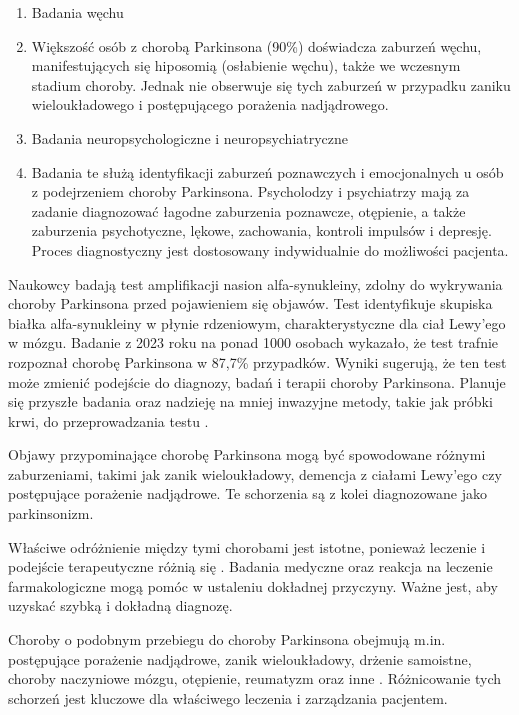 \begin{enumerate}
	\item Badania węchu
	\item[]Większość osób z chorobą Parkinsona (90\%) doświadcza zaburzeń węchu, manifestujących się hiposomią (osłabienie węchu), także we wczesnym stadium choroby.
Jednak nie obserwuje się tych zaburzeń w przypadku zaniku wieloukładowego i postępującego porażenia nadjądrowego.

	\item Badania neuropsychologiczne i neuropsychiatryczne
	\item[]Badania te służą identyfikacji zaburzeń poznawczych i emocjonalnych u osób z podejrzeniem choroby Parkinsona.
Psycholodzy i psychiatrzy mają za zadanie diagnozować łagodne zaburzenia poznawcze, otępienie, a także zaburzenia psychotyczne, lękowe, zachowania, kontroli impulsów i depresję.
Proces diagnostyczny jest dostosowany indywidualnie do możliwości pacjenta.
\end{enumerate}

Naukowcy badają test amplifikacji nasion alfa-synukleiny, zdolny do wykrywania choroby Parkinsona przed pojawieniem się objawów.
Test identyfikuje skupiska białka alfa-synukleiny w płynie rdzeniowym, charakterystyczne dla ciał Lewy'ego w mózgu.
Badanie z 2023 roku na ponad 1000 osobach wykazało, że test trafnie rozpoznał chorobę Parkinsona w 87,7\% przypadków.
Wyniki sugerują, że ten test może zmienić podejście do diagnozy, badań i terapii choroby Parkinsona.
Planuje się przyszłe badania oraz nadzieję na mniej inwazyjne metody, takie jak próbki krwi, do przeprowadzania testu \cite{Mayo_Clinic_PD}.

Objawy przypominające chorobę Parkinsona mogą być spowodowane różnymi zaburzeniami, takimi jak zanik wieloukładowy, demencja z ciałami Lewy'ego czy postępujące porażenie nadjądrowe. Te schorzenia są z kolei diagnozowane jako parkinsonizm.

Właściwe odróżnienie między tymi chorobami jest istotne, ponieważ leczenie i podejście terapeutyczne różnią się \cite{National_Institute_on_Aging_2022}.
Badania medyczne oraz reakcja na leczenie farmakologiczne mogą pomóc w ustaleniu dokładnej przyczyny.
Ważne jest, aby uzyskać szybką i dokładną diagnozę.

Choroby o podobnym przebiegu do choroby Parkinsona obejmują m.in. postępujące porażenie nadjądrowe, zanik wieloukładowy, drżenie samoistne, choroby naczyniowe mózgu, otępienie, reumatyzm oraz inne \cite{diagnostyka_Sitek}.
Różnicowanie tych schorzeń jest kluczowe dla właściwego leczenia i zarządzania pacjentem.

